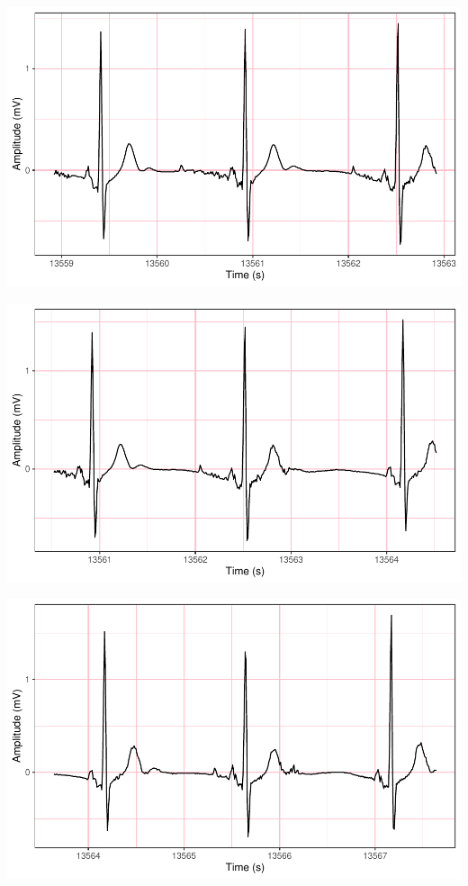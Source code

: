 \documentclass[
]{article}
\begin{document}
\begin{center}\includegraphics{report_files/figure-latex/abnormal-interval-24} \end{center}

\begin{center}\includegraphics{report_files/figure-latex/abnormal-interval-25} \end{center}

\begin{center}\includegraphics{report_files/figure-latex/abnormal-interval-26} \end{center}
\end{document}
